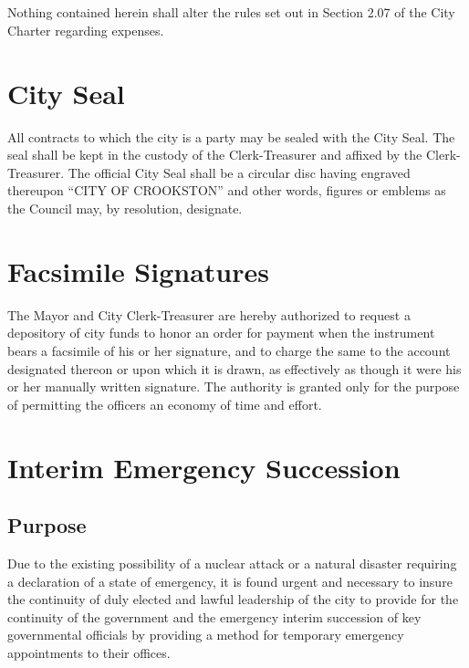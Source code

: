 \subsection{}
Nothing contained herein shall alter the rules set out in Section 2.07 of the City Charter regarding expenses.

\section{City Seal}
All contracts to which the city is a party may be sealed with the City Seal.  The seal shall be kept in the custody of the Clerk-Treasurer and affixed by the Clerk-Treasurer.  The official City Seal shall be a circular disc having engraved thereupon “CITY OF CROOKSTON” and other words, figures or emblems as the Council may, by resolution, designate.

\section{Facsimile Signatures}
The Mayor and City Clerk-Treasurer are hereby authorized to request a depository of city funds to honor an order for payment when the instrument bears a facsimile of his or her signature, and to charge the same to the account designated thereon or upon which it is drawn, as effectively as though it were his or her manually written signature. The authority is granted only for the purpose of permitting the officers an economy of time and effort.

\section{Interim Emergency Succession}
\subsection{Purpose}
Due to the existing possibility of a nuclear attack or a natural disaster requiring a declaration of a state of emergency, it is found urgent and necessary to insure the continuity of duly elected and lawful leadership of the city to provide for the continuity of the government and the emergency interim succession of key governmental officials by providing a method for temporary emergency appointments to their offices.

